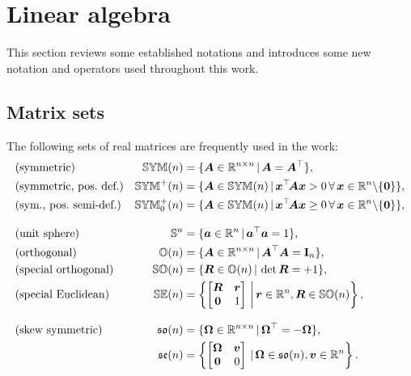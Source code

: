 \section{Linear algebra}
This section reviews some established notations and introduces some new notation and operators used throughout this work.

\subsection{Matrix sets}
The following sets of real matrices are frequently used in the work: 
\begin{subequations}
\begin{align}
 &\text{(symmetric)}&
 \SymMat(n) &= \{ \mat{A} \in \RealNum^{n\times n} \, | \, \mat{A} = \mat{A}^\top \},
\\
 &\text{(symmetric, pos.\ def.)}&
 \SymMatP(n) &= \{ \mat{A} \in \SymMat(n) \, | \, \tuple{x}^\top\! \mat{A} \tuple{x} > 0 \, \forall \, \tuple{x} \in \RealNum^{n} \backslash \{\tuple{0}\} \},
\\
 &\text{(sym., pos.\ semi-def.)}&
 \SymMatSP(n) &= \{ \mat{A} \in \SymMat(n) \, | \, \tuple{x}^\top\! \mat{A} \tuple{x} \geq 0 \, \forall \, \tuple{x} \in \RealNum^{n} \backslash \{\tuple{0}\} \},
\\[2ex]
 &\text{(unit sphere)}&
 \mathbb{S}^n &= \{ \tuple{a} \in \RealNum^{n} \, | \, \tuple{a}^\top\tuple{a} = 1 \},
\\
 &\text{(orthogonal)}&
 \mathbb{O}(n) &= \{ \mat{A} \in \RealNum^{n\times n} \, | \, \mat{A}^\top \mat{A} = \idMat[n] \},
\\
 &\text{(special orthogonal)}&
 \SpecialOrthogonalGroup(n) &= \{ \mat{R} \in \mathbb{O}(n) \, | \, \det\mat{R} = +1 \},
\\
 &\text{(special Euclidean)}&
 \SpecialEuclideanGroup(n) &= \left\{ \begin{bmatrix} \R & \r \\ \mat{0} & 1 \end{bmatrix} \, \bigg| \, \r \in \RealNum^n, \R \in \SpecialOrthogonalGroup(n) \right\},
\\[2ex]
 &\text{(skew symmetric)}&
 \SpecialOrthogonalAlgebra(n) &= \{ \mat{\Omega} \in \RealNum^{n\times n} \, | \, \mat{\Omega}^\top = -\mat{\Omega} \},
\\
 &\text{}&
 \SpecialEuclideanAlgebra(n) &= \left\{ \begin{bmatrix} \mat{\Omega} & \tuple{v} \\ \mat{0} & 0 \end{bmatrix} \, | \, \mat{\Omega} \in \SpecialOrthogonalAlgebra(n), \tuple{v} \in \RealNum^{n} \right\}.
\end{align} 
\end{subequations}

